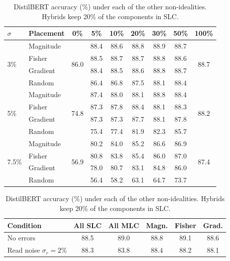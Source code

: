 \begin{table}[h!]
\begin{minipage}[t]{0.48\textwidth}
\centering\footnotesize
\caption{DistilBERT accuracy (\%) by share of components in SLC, mean of 20 chips. 0\% and 100\% are
all-MLC and all-SLC.}\label{tab:d-share}
\setlength{\tabcolsep}{3.2pt}
\begin{tabular}{@{}llccccccc@{}}
\toprule
$\sigma$ & Placement & 0\% & 5\% & 10\% & 20\% & 30\% & 50\% & 100\% \\
\midrule
\multirow{4}{*}{3\%}
 & Magnitude & \multirow{4}{*}{86.0} & 88.4 & 88.6 & 88.8 & 88.9 & 88.7 & \multirow{4}{*}{88.7} \\
 & Fisher    & & 88.5 & 88.7 & 88.7 & 88.8 & 88.6 & \\
 & Gradient  & & 88.4 & 88.5 & 88.6 & 88.8 & 88.7 & \\
 & Random    & & 86.4 & 86.8 & 87.5 & 88.1 & 88.4 & \\
\midrule
\multirow{4}{*}{5\%}
 & Magnitude & \multirow{4}{*}{74.8} & 87.4 & 88.0 & 88.1 & 88.8 & 88.4 & \multirow{4}{*}{88.2} \\
 & Fisher    & & 87.3 & 87.8 & 88.4 & 88.1 & 88.3 & \\
 & Gradient  & & 87.3 & 87.3 & 87.7 & 88.1 & 87.8 & \\
 & Random    & & 75.4 & 77.4 & 81.9 & 82.3 & 85.7 & \\
\midrule
\multirow{4}{*}{7.5\%}
 & Magnitude & \multirow{4}{*}{56.9} & 80.2 & 84.0 & 85.2 & 86.6 & 86.9 & \multirow{4}{*}{87.4} \\
 & Fisher    & & 80.8 & 83.8 & 85.4 & 86.0 & 87.0 & \\
 & Gradient  & & 78.0 & 80.7 & 83.1 & 84.8 & 86.0 & \\
 & Random    & & 56.4 & 58.2 & 63.1 & 64.7 & 73.7 & \\
\bottomrule
\end{tabular}
\end{minipage}\hfill
\begin{minipage}[t]{0.48\textwidth}
\centering\footnotesize
\caption{DistilBERT accuracy (\%) under each of the other non-idealities. Hybrids keep 20\% of the components
in SLC.}\label{tab:d-chip}
\setlength{\tabcolsep}{2.4pt}
\begin{tabular}{@{}lccccc@{}}
\toprule
Condition & All SLC & All MLC & Magn. & Fisher & Grad. \\
\midrule
No errors & 88.5 & 89.0 & 88.8 & 89.1 & 88.6 \\
\midrule
Read noise $\sigma_r=2\%$ & 88.3 & 83.8 & 88.4 & 88.2 & 88.1 \\

\end{tabular}
\end{minipage}
\end{table}

